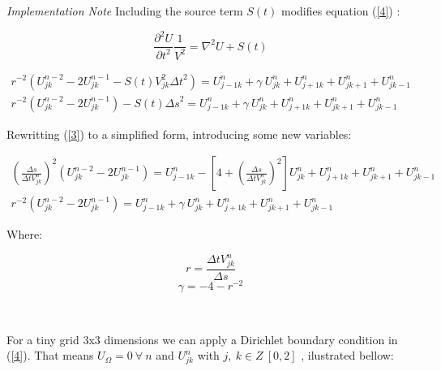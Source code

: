 \documentclass[legalpaper, 12pt]{article}
\begin{document}
\textit{Implementation Note} Including the source term $S(t)$ modifies equation (\ref{4}) :

$$ \frac{\partial^2 U}{\partial t^2} \frac{1}{V^2} = \nabla^2 U + S(t)  $$

\begin{eqnarray}
r^{-2} \left( U_{jk}^{n-2} -2 U_{jk}^{n-1} - S(t) V_{jk}^2 {\Delta t}^2 \right) =
  U_{j-1k}^n + \gamma \  U_{jk}^n + U_{j+1k}^n + U_{jk+1}^n + U_{jk-1}^n \nonumber  \\ 
r^{-2} \left( U_{jk}^{n-2} -2 U_{jk}^{n-1} \right) - S(t) {\Delta s}^2 =
  U_{j-1k}^n + \gamma \  U_{jk}^n + U_{j+1k}^n + U_{jk+1}^n + U_{jk-1}^n \nonumber  \nonumber 
\end{eqnarray}


\newpage

Rewritting (\ref{3}) to a simplified form, introducing some new variables: 

\begin{multline}
\left( \frac{\Delta s}{ \Delta t  V_{jk}^n} \right) ^2 \left( U_{jk}^{n-2} -2 U_{jk}^{n-1} \right) =
  U_{j-1k}^n - \left[ 4+ \left( \frac{\Delta s}{\Delta t  V_{jk}^n} \right) ^2  \right] U_{jk}^n + U_{j+1k}^n + U_{jk+1}^n + U_{jk-1}^n  \\
r^{-2} \left( U_{jk}^{n-2} -2 U_{jk}^{n-1} \right) =
  U_{j-1k}^n + \gamma \  U_{jk}^n + U_{j+1k}^n + U_{jk+1}^n + U_{jk-1}^n 
\label{4}
\end{multline}

Where: 

$$ r = \frac{\Delta t  V_{jk}^n}{ \Delta s} $$
$$ \gamma = -4 -r^{-2}  $$

\

For a tiny grid 3x3 dimensions we can apply a Dirichlet boundary condition in (\ref{4}). That means $ U_{\Omega} = 0 \ \forall \ n $ and $ U_{jk}^n $ with $ j, \ k \in Z \ \left[ 0, 2  \right] $ , ilustrated bellow: \\ 
\newline
\end{document}
